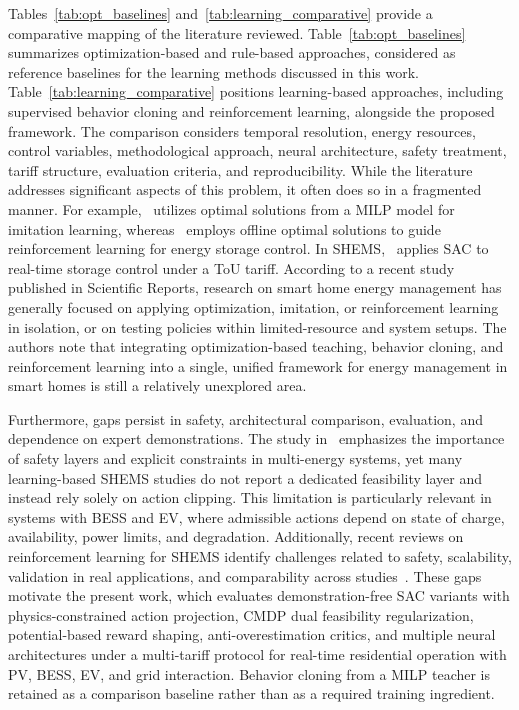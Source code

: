 \documentclass[preprint,12pt, 3p]{elsarticle}
\begin{document}
Tables~\ref{tab:opt_baselines} and~\ref{tab:learning_comparative} provide a comparative mapping of the literature reviewed. Table~\ref{tab:opt_baselines} summarizes optimization-based and rule-based approaches, considered as reference baselines for the learning methods discussed in this work. Table~\ref{tab:learning_comparative} positions learning-based approaches, including supervised behavior cloning and reinforcement learning, alongside the proposed framework. The comparison considers temporal resolution, energy resources, control variables, methodological approach, neural architecture, safety treatment, tariff structure, evaluation criteria, and reproducibility. While the literature addresses significant aspects of this problem, it often does so in a fragmented manner. For example,~\cite{9585298} utilizes optimal solutions from a \gls{MILP} model for imitation learning, whereas~\cite{XU2024122915} employs offline optimal solutions to guide reinforcement learning for energy storage control. In \gls{SHEMS},~\cite{XIONG20243501} applies \gls{SAC} to real-time storage control under a \gls{ToU} tariff. According to a recent study published in Scientific Reports, research on smart home energy management has generally focused on applying optimization, imitation, or reinforcement learning in isolation, or on testing policies within limited-resource and system setups. The authors note that integrating optimization-based teaching, behavior cloning, and reinforcement learning into a single, unified framework for energy management in smart homes is still a relatively unexplored area.

Furthermore, gaps persist in safety, architectural comparison, evaluation, and dependence on expert demonstrations. The study in~\cite{CEUSTERS2023101202} emphasizes the importance of safety layers and explicit constraints in multi-energy systems, yet many learning-based \gls{SHEMS} studies do not report a dedicated feasibility layer and instead rely solely on action clipping. This limitation is particularly relevant in systems with \gls{BESS} and \gls{EV}, where admissible actions depend on state of charge, availability, power limits, and degradation. Additionally, recent reviews on reinforcement learning for \gls{SHEMS} identify challenges related to safety, scalability, validation in real applications, and comparability across studies~\cite{en17246420}. These gaps motivate the present work, which evaluates demonstration-free \gls{SAC} variants with physics-constrained action projection, \gls{CMDP} dual feasibility regularization, potential-based reward shaping, anti-overestimation critics, and multiple neural architectures under a multi-tariff protocol for real-time residential operation with \gls{PV}, \gls{BESS}, \gls{EV}, and grid interaction. Behavior cloning from a \gls{MILP} teacher is retained as a comparison baseline rather than as a required training ingredient.
\end{document}
